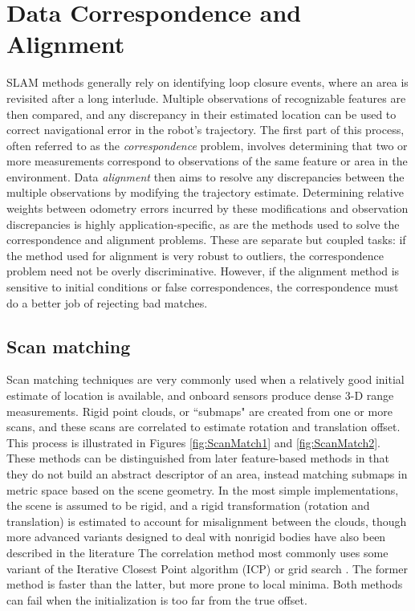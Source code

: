 \section{Data Correspondence and Alignment}

SLAM methods generally rely on identifying loop closure events, where an area is revisited after a long interlude. Multiple observations of recognizable features are then compared, and any discrepancy in their estimated location can be used to correct navigational error in the robot's trajectory. The first part of this process, often referred to as the \emph{correspondence} problem, involves determining that two or more measurements correspond to observations of the same feature or area in the environment. Data \emph{alignment} then aims to resolve any discrepancies between the multiple observations by modifying the trajectory estimate. Determining relative weights between odometry errors incurred by these modifications and observation discrepancies is highly application-specific, as are the methods used to solve the correspondence and alignment problems. These are separate but coupled tasks: if the method used for alignment is very robust to outliers, the correspondence problem need not be overly discriminative. However, if the alignment method is sensitive to initial conditions or false correspondences, the correspondence must do a better job of rejecting bad matches. 


\subsection{Scan matching}

Scan matching techniques are very commonly used when a relatively good initial estimate of location is available, and onboard sensors produce dense 3-D range measurements. Rigid point clouds, or ``submaps" are created from one or more scans, and these scans are correlated to estimate rotation and translation offset. This process is illustrated in Figures \ref{fig:ScanMatch1} and \ref{fig:ScanMatch2}. These methods can be distinguished from later feature-based methods in that they do not build an abstract descriptor of an area, instead matching submaps in metric space based on the scene geometry. In the most simple implementations, the scene is assumed to be rigid, and a rigid transformation (rotation and translation) is estimated to account for misalignment between the clouds, though more advanced variants designed to deal with nonrigid bodies have also been described in the literature \cite{Amberg2007, Feldmar1996,Haehnel2003} The correlation method most commonly uses some variant of the Iterative Closest Point algorithm (ICP) \cite{Besl1992} or grid search \cite{Miller2013}. The former method is faster than the latter, but more prone to local minima. Both methods can fail when the initialization is too far from the true offset. 

